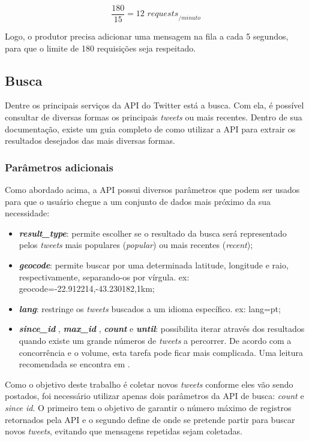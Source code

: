 $$ \frac{180}{15} = 12 \textit{ requests}_{/minuto} $$

Logo, o produtor precisa adicionar uma mensagem na fila a cada 5 segundos, para que o limite de 180 requisições seja respeitado.


\subsection{Busca}
Dentre os principais serviços da API do Twitter está a busca. Com ela, é possível consultar de diversas formas os principais \textit{tweets} ou mais recentes. Dentro de sua documentação, existe um guia completo de como utilizar a API  para extrair os resultados desejados \cite{twittersearchapi} das mais diversas formas. 

\subsubsection{Parâmetros adicionais}

Como abordado acima, a API possui diversos parâmetros que podem ser usados para que o usuário chegue a um conjunto de dados mais próximo da sua necessidade:

\begin{itemize}
	\item \textit{\textbf{result\_type}}: permite escolher se o resultado da busca será representado pelos \textit{tweets} mais populares (\textit{popular}) ou mais recentes (\textit{recent});
	\item \textit{\textbf{geocode}}: permite buscar por uma determinada latitude, longitude e raio, respectivamente, separando-os por vírgula. ex: geocode=-22.912214,-43.230182,1km;
	\item \textit{\textbf{lang}}: restringe os \textit{tweets} buscados a um idioma específico. ex: lang=pt;
	\item \textit{\textbf{since\_id }},  \textit{\textbf{max\_id }}, \textit{\textbf{count}} e \textit{\textbf{until}}: possibilita iterar através dos resultados quando existe um grande números de \textit{tweets} a percorrer. De acordo com a concorrência e o volume, esta tarefa pode ficar mais complicada. Uma leitura recomendada se encontra em \cite{workingwithtimelimes}.
\end{itemize}

Como o objetivo deste trabalho é coletar novos \textit{tweets} conforme eles vão sendo postados, foi necessário utilizar apenas dois parâmetros da API de busca: \textit{count} e \textit{since id}. O primeiro tem o objetivo de garantir o número máximo de registros retornados pela API e o segundo define de onde se pretende partir para buscar novos \textit{tweets}, evitando que mensagens repetidas sejam coletadas.

